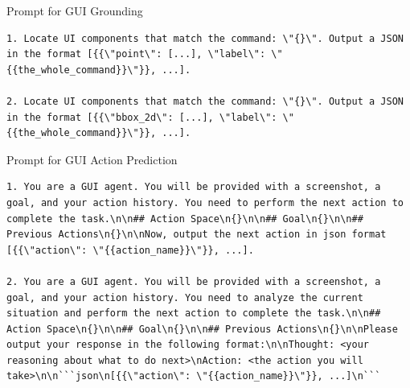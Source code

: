 \documentclass{llmxive}
\begin{document}

\begin{promptbox}{Prompt for GUI Grounding}
\begin{lstlisting}
1. Locate UI components that match the command: \"{}\". Output a JSON in the format [{{\"point\": [...], \"label\": \"{{the_whole_command}}\"}}, ...].

2. Locate UI components that match the command: \"{}\". Output a JSON in the format [{{\"bbox_2d\": [...], \"label\": \"{{the_whole_command}}\"}}, ...].
\end{lstlisting}
\end{promptbox}

\begin{promptbox}{Prompt for GUI Action Prediction}
\begin{lstlisting}
1. You are a GUI agent. You will be provided with a screenshot, a goal, and your action history. You need to perform the next action to complete the task.\n\n## Action Space\n{}\n\n## Goal\n{}\n\n## Previous Actions\n{}\n\nNow, output the next action in json format [{{\"action\": \"{{action_name}}\"}}, ...].

2. You are a GUI agent. You will be provided with a screenshot, a goal, and your action history. You need to analyze the current situation and perform the next action to complete the task.\n\n## Action Space\n{}\n\n## Goal\n{}\n\n## Previous Actions\n{}\n\nPlease output your response in the following format:\n\nThought: <your reasoning about what to do next>\nAction: <the action you will take>\n\n```json\n[{{\"action\": \"{{action_name}}\"}}, ...]\n```
\end{lstlisting}
\end{promptbox}
\end{document}
